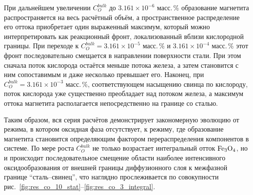 \documentclass[12pt, a4paper]{article}
\begin{document}
При дальнейшем увеличении $C_O^{bulk}$ до $3.161\times10^{-6}$ масс.\,\% образование магнетита распространяется на весь расчётный объём, а пространственное распределение его оттока приобретает один выраженный максимум, который можно интерпретировать как реакционный фронт, локализованный вблизи кислородной границы. При переходе к $C_O^{bulk}=3.161\times10^{-5}$ масс.\,\% и $3.161\times10^{-4}$ масс.\,\% этот фронт последовательно смещается в направлении поверхности стали. При этом сначала поток кислорода остаётся меньше потока железа, а затем становится с ним сопоставимым и даже несколько превышает его. Наконец, при $C_O^{bulk}=3.161\times10^{-3}$ масс.\,\%, соответствующем насыщению свинца по кислороду, поток кислорода уже существенно преобладает над потоком железа, а максимум оттока магнетита располагается непосредственно на границе со сталью.

Таким образом, вся серия расчётов демонстрирует закономерную эволюцию от режима, в котором оксидная фаза отсутствует, к режиму, где образование магнетита становится определяющим фактором перераспределения компонентов в системе. По мере роста $C_O^{bulk}$ не только возрастает интегральный отток $\ce{Fe3O4}$, но и происходит последовательное смещение области наиболее интенсивного оксидообразования от внешней границы диффузионного слоя к межфазной границе ``сталь--свинец'', что наглядно прослеживается по совокупности рис.~\ref{fig:res_co_10_stat}--\ref{fig:res_co_3_integral}.

\printbibliography
\end{document}
